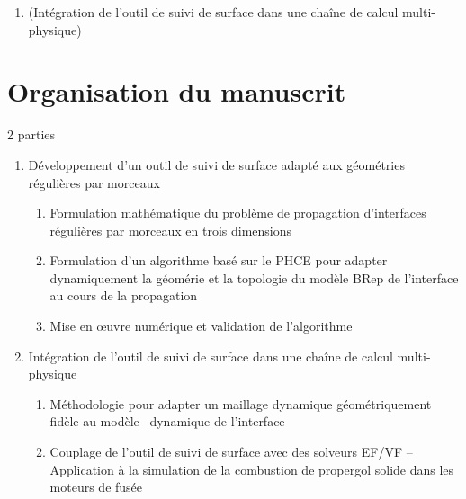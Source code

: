 \begin{enumerate}
	
	\item (Intégration de l'outil de suivi de surface dans une chaîne de calcul multi-physique)
\end{enumerate}



\section*{Organisation du manuscrit}
2 parties
\begin{enumerate}
	\item Développement d'un outil de suivi de surface adapté aux géométries régulières par morceaux
	\begin{enumerate}
		\item Formulation mathématique du problème de propagation d'interfaces régulières par morceaux en trois dimensions
		\item Formulation d'un algorithme basé sur le PHCE pour adapter dynamiquement la géomérie et la topologie du modèle BRep de l'interface au cours de la propagation
		\item Mise en \oe uvre numérique et validation de l'algorithme
	\end{enumerate}
	
	\item Intégration de l'outil de suivi de surface dans une chaîne de calcul multi-physique
	\begin{enumerate}
		\item Méthodologie pour adapter un maillage dynamique géométriquement fidèle au modèle \brep\ dynamique de l'interface
		\item Couplage de l'outil de suivi de surface avec des solveurs EF/VF -- Application à la simulation de la combustion de propergol solide dans les moteurs de fusée
	\end{enumerate}
\end{enumerate}
